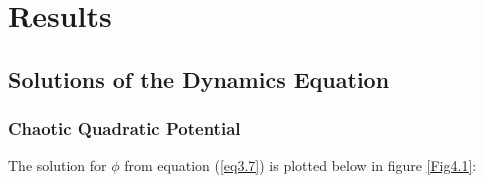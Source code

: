 \documentclass[a4paper,12pt,twoside]{report}
\begin{document}

\chapter{Results}
\label{chap:Results}

\section{Solutions of the Dynamics Equation} \label{sec:SolDynEq}

\subsection{Chaotic Quadratic Potential} \label{subsec:Res_Dyn_Square}

The solution for $\phi$ from equation (\ref{eq3.7}) is plotted below in figure \ref{Fig4.1}:

\noindent%
\begin{minipage}{\linewidth}%
\label{Fig4.1}
\end{minipage}
\\[10pt]
\end{document}
